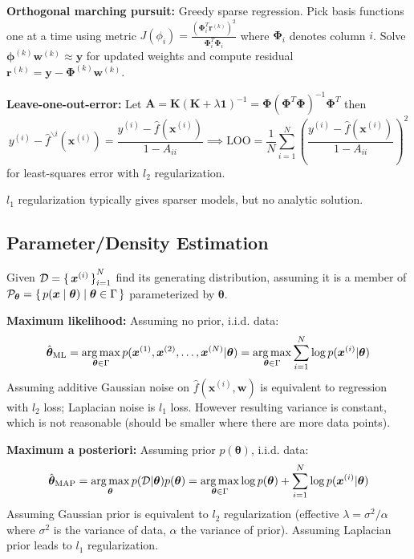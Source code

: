 \documentclass[twocolumn, 8pt]{extarticle}
\begin{document}
\textbf{Orthogonal marching pursuit:} Greedy sparse regression. Pick basis functions one at a time using metric
\(J(\phi _i) = \frac{(\bm\Phi _i^T\bm r^{(k)})^2}{\bm\Phi _i^T\bm\Phi _i}\) where $\bm\Phi _i$ denotes column $i$.
Solve \(\bm\phi^{(k)}\bm w^{(k)} \approx \bm y\) for updated weights and compute residual
\(\bm r^{(k)} = \bm y - \bm\Phi^{(k)}\bm w^{(k)}\).

\textbf{Leave-one-out-error:} Let $\bm A = \bm K(\bm K + \lambda\bm 1)^{-1} = \bm\Phi(\bm\Phi^T\bm\Phi)^{-1}\bm\Phi^T$
then
\[
    y^{(i)} - \hat f^{\backslash i}(\bm x^{(i)}) = \frac{y^{(i)} - \hat f(\bm x^{(i)})}{1 - A_{ii}} 
    \implies \text{LOO} = \frac{1}{N}\sum _{i = 1}^N \left(\frac{y^{(i)} - \hat f(\bm x^{(i)})}{1 - A_{ii}}\right)^2
\]
for least-squares error with \(l_2\) regularization.

\(l_1\) regularization typically gives sparser models, but no analytic solution.

\subsection{Parameter/Density Estimation} %

Given \(\mathcal D = \set{\bm x^{(i)}}_{i = 1}^N\) find its generating distribution, assuming it is a member of
\(\mathcal P_{\bm\theta} = \set{p(\bm x | \bm \theta) \mid \bm \theta \in \Gamma}\) parameterized by \(\bm\theta\).

\textbf{Maximum likelihood:} Assuming no prior, i.i.d. data:
\[\hat{\bm\theta}_\text{ML} = \operatorname*{arg\,max} _{\bm \theta \in \Gamma} p(\bm x^{(1)}, \bm x^{(2)}, \dots, \bm x^{(N)} | \bm\theta) = \operatorname*{arg\,max} _{\bm \theta \in \Gamma} \sum _{i = 1}^N \log p(\bm x^{(i)} | \bm\theta)\]
Assuming additive Gaussian noise on \(\hat f(\bm x^{(i)}, \bm w)\) is equivalent to regression with \(l_2\) loss;
Laplacian noise is \(l_1\) loss. However resulting variance is constant, which is not reasonable (should be smaller
where there are more data points).

\textbf{Maximum a posteriori:} Assuming prior \(p(\bm\theta)\), i.i.d. data:
\[
    \hat{\bm\theta}_\text{MAP} = \operatorname*{arg\,max} _{\bm\theta} p(\mathcal D| \bm\theta)p(\bm\theta)
    = \operatorname*{arg\,max} _{\bm \theta \in \Gamma} \log p(\bm\theta) + \sum _{i = 1}^N \log p(\bm x^{(i)} | \bm\theta)
\]
Assuming Gaussian prior is equivalent to \(l_2\) regularization (effective \(\lambda = \sigma^2/\alpha\) where
\(\sigma^2\) is the variance of data, \(\alpha\) the variance of prior). Assuming Laplacian prior leads to \(l_1\)
regularization.
\end{document}
